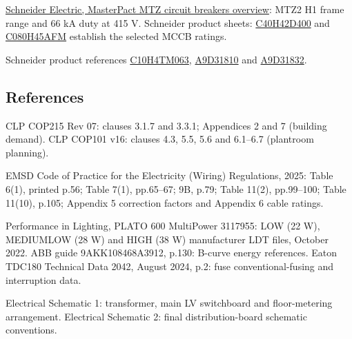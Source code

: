 \href{https://ckm-content.se.com/ckmContent/sfc/servlet.shepherd/document/download/0691H00000FWgC6QAL}{Schneider Electric, MasterPact MTZ circuit breakers overview}: MTZ2 H1 frame range and 66 kA duty at 415 V. Schneider product sheets: \href{https://www.se.com/nl/nl/product/C40H42D400/compact-vermogenschakelaar-nsx400h-70ka-ac-4p4d-400a-2-3/}{C40H42D400} and \href{https://www.se.com/uk/en/product/C080H45AFM/circuit-breaker-compact-ns800h-70ka-at-415vac-4p-fixed-manually-operated-micrologic-5-0a-control-unit-800a/}{C080H45AFM} establish the selected MCCB ratings.

Schneider product references \href{https://www.se.com/nl/en/product/C10H4TM063/}{C10H4TM063}, \href{https://www.se.com/uk/en/product/A9D31810/ic60h-earth-leakage-circuit-breaker-1p-\%2B-n-b-curve-10-a-30-ma-240-v/}{A9D31810} and \href{https://www.se.com/uk/en/product/A9D31832/ic60h-earth-leakage-circuit-breaker-1p-\%2B-n-b-curve-32-a-30-ma-240-v/}{A9D31832}.

\subsection*{References}
CLP COP215 Rev 07: clauses 3.1.7 and 3.3.1; Appendices 2 and 7 (building demand). CLP COP101 v16: clauses 4.3, 5.5, 5.6 and 6.1--6.7 (plantroom planning).

EMSD Code of Practice for the Electricity (Wiring) Regulations, 2025: Table 6(1), printed p.56; Table 7(1), pp.65--67; 9B, p.79; Table 11(2), pp.99--100; Table 11(10), p.105; Appendix 5 correction factors and Appendix 6 cable ratings.

Performance in Lighting, PLATO 600 MultiPower 3117955: LOW (22 W), MEDIUMLOW (28 W) and HIGH (38 W) manufacturer LDT files, October 2022. ABB guide 9AKK108468A3912, p.130: B-curve energy references. Eaton TDC180 Technical Data 2042, August 2024, p.2: fuse conventional-fusing and interruption data. 

\noindent Electrical Schematic 1: transformer, main LV switchboard and floor-metering arrangement. Electrical Schematic 2: final distribution-board schematic conventions.

\endgroup
